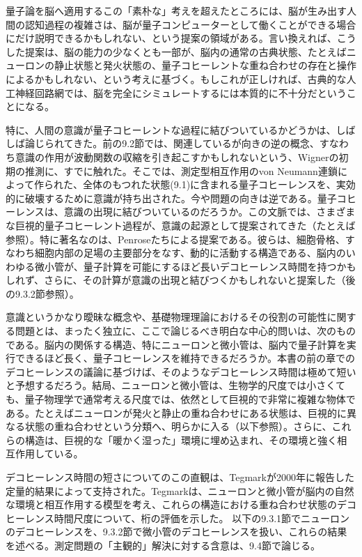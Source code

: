 \hypertarget{srcpage:367}{}\label{srcpage:367}
量子論を脳へ適用するこの「素朴な」考えを超えたところには、脳が生み出す人間の認知過程の複雑さは、脳が量子コンピューターとして働くことができる場合にだけ説明できるかもしれない、という提案の領域がある。言い換えれば、こうした提案は、脳の能力の少なくとも一部が、脳内の通常の古典状態、たとえばニューロンの静止状態と発火状態の、量子コヒーレントな重ね合わせの存在と操作によるかもしれない、という考えに基づく。もしこれが正しければ、古典的な人工神経回路網では、脳を完全にシミュレートするには本質的に不十分だということになる。

特に、人間の意識が量子コヒーレントな過程に結びついているかどうかは、しばしば論じられてきた。前の9.2節では、関連しているが向きの逆の概念、すなわち意識の作用が波動関数の収縮を引き起こすかもしれないという、Wignerの初期の推測\cite{ref498}に、すでに触れた。そこでは、測定型相互作用のvon Neumann連鎖によって作られた、全体のもつれた状態(9.1)に含まれる量子コヒーレンスを、実効的に破壊するために意識が持ち出された。今や問題の向きは逆である。量子コヒーレンスは、意識の出現に結びついているのだろうか。この文脈では、さまざまな巨視的量子コヒーレント過程が、意識の起源として提案されてきた（たとえば\cite{ref505,ref506,ref507,ref508,ref509,ref510,ref511}参照）。特に著名なのは、Penrose\cite{ref473}たち\cite{ref512,ref513,ref514}による提案である。彼らは、細胞骨格、すなわち細胞内部の足場の主要部分をなす、動的に活動する構造である、脳内のいわゆる微小管が、量子計算を可能にするほど長いデコヒーレンス時間を持つかもしれず、さらに、その計算が意識の出現と結びつくかもしれないと提案した（後の9.3.2節参照）。

意識というかなり曖昧な概念や、基礎物理理論におけるその役割の可能性に関する問題とは、まったく独立に、ここで論じるべき明白な中心的問いは、次のものである。脳内の関係する構造、特にニューロンと微小管は、脳内で量子計算を実行できるほど長く、量子コヒーレンスを維持できるだろうか。本書の前の章でのデコヒーレンスの議論に基づけば、そのようなデコヒーレンス時間は極めて短いと予想するだろう。結局、ニューロンと微小管は、生物学的尺度では小さくても、量子物理学で通常考える尺度では、依然として巨視的で非常に複雑な物体である。たとえばニューロンが発火と静止の重ね合わせにある状態は、巨視的に異なる状態の重ね合わせという分類へ、明らかに入る（以下参照）。さらに、これらの構造は、巨視的な「暖かく湿った」環境に埋め込まれ、その環境と強く相互作用している。

デコヒーレンス時間の短さについてのこの直観は、Tegmarkが2000年に報告した定量的結果\cite{ref515}によって支持された。Tegmarkは、ニューロンと微小管が脳内の自然な環境と相互作用する模型を考え、これらの構造における重ね合わせ状態のデコヒーレンス時間尺度について、桁の評価を示した。
\hypertarget{srcpage:368}{}\label{srcpage:368}
以下の9.3.1節でニューロンのデコヒーレンスを、9.3.2節で微小管のデコヒーレンスを扱い、これらの結果を述べる。測定問題の「主観的」解決に対する含意は、9.4節で論じる。

